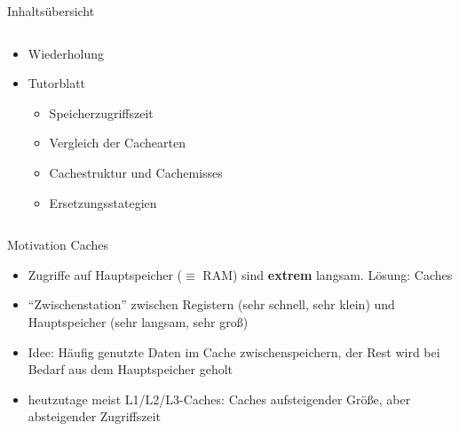 \documentclass[
  german,            %
  aspectratio=169,    %
]{tumbeamer}
\begin{document}
\begin{frame}[c]{Inhaltsübersicht}{}
  \begin{columns}[c]
    \begin{column}{1\textwidth}
      \begin{itemize}
        \item Wiederholung
        \item Tutorblatt
        \begin{itemize}
          \item Speicherzugriffszeit
          \item Vergleich der Cachearten
          \item Cachestruktur und Cachemisses
          \item Ersetzungsstategien
        \end{itemize}
      \end{itemize}
    \end{column}
  \end{columns}
\end{frame}

\begin{frame}[fragile, c]{Motivation Caches}{}
  \begin{itemize}
    \item Zugriffe auf Hauptspeicher ($\equiv$ RAM) sind \textbf{extrem} langsam. Lösung: Caches
    \item \enquote{Zwischenstation} zwischen Registern (sehr schnell, sehr klein) und Hauptspeicher (sehr langsam, sehr groß)
    \item Idee: Häufig genutzte Daten im Cache zwischenspeichern, der Rest wird bei Bedarf aus dem Hauptspeicher geholt
    \item heutzutage meist L1/L2/L3-Caches: Caches aufsteigender Größe, aber absteigender Zugriffszeit
  \end{itemize}
  
\end{frame}
\end{document}
